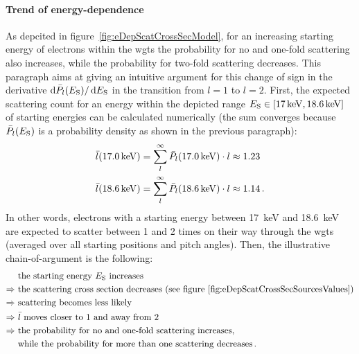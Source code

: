 \paragraph{Trend of energy-dependence}
As depcited in figure~\ref{fig:eDepScatCrossSecModel}, for an increasing starting energy of electrons within the \gls{wgts} the probability for no and one-fold scattering also increases, while the probability for two-fold scattering decreases. This paragraph aims at giving an intuitive argument for this change of sign in the derivative $\mathop{}\!\mathrm{d} \bar{P}_l(E_\mathrm{S}) / \mathop{}\!\mathrm{d} E_\mathrm{S}$ in the transition from $l=1$ to $l=2$. First, the expected scattering count for an energy within the depicted range $E_\mathrm{S} \in [\SI{17}{keV}, \SI{18.6}{keV}]$ of starting energies can be calculated numerically (the sum converges because $\bar{P}_l(E_\mathrm{S})$ is a probability density as shown in the previous paragraph):
\begin{align}
	\bar{l}(\SI{17.0}{keV}) &= 
	\sum_{l}^{\infty} \bar{P}_l(\SI{17.0}{keV}) \cdot l \approx 1.23 \\	
	\bar{l}(\SI{18.6}{keV}) &= 
	\sum_{l}^{\infty} \bar{P}_l(\SI{18.6}{keV}) \cdot l \approx 1.14
	\text{\,.}
\end{align} 
In other words, electrons with a starting energy between \SI{17}{keV} and \SI{18.6}{keV} are expected to scatter between 1 and 2 times on their way through the \gls{wgts} (averaged over all starting positions and pitch angles). Then, the illustrative chain-of-argument is the following: 
\begin{align*}
	&\text{ the starting energy $E_\mathrm{S}$ increases} \\ \Rightarrow
	&\text{ the scattering cross section decreases (see figure~\ref{fig:eDepScatCrossSecSourcesValues})} \\ \Rightarrow
	&\text{ scattering becomes less likely} \\ \Rightarrow
	&\text{ $\bar{l}$ moves closer to 1 and away from 2} \\ \Rightarrow
	&\text{ the probability for no and one-fold scattering increases,} \\
	&\text{ while the probability for more than one scattering decreases}
	\text{\,.}
\end{align*} 

\FloatBarrier


